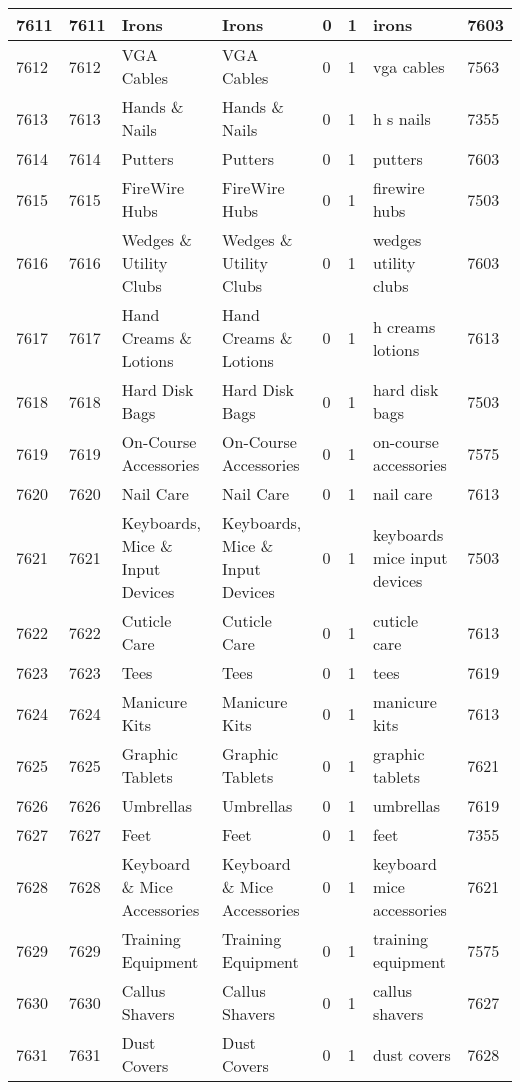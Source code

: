 \begin{longtable}{|l|l|l|l|l|l|l|l|}
7611 & 7611 & Irons & Irons & 0 & 1 & irons & 7603 \\ \hline 
7612 & 7612 & VGA Cables & VGA Cables & 0 & 1 & vga cables & 7563 \\ \hline 
7613 & 7613 & Hands \& Nails & Hands \& Nails & 0 & 1 & h s nails & 7355 \\ \hline 
7614 & 7614 & Putters & Putters & 0 & 1 & putters & 7603 \\ \hline 
7615 & 7615 & FireWire Hubs & FireWire Hubs & 0 & 1 & firewire hubs & 7503 \\ \hline 
7616 & 7616 & Wedges \& Utility Clubs & Wedges \& Utility Clubs & 0 & 1 & wedges utility clubs & 7603 \\ \hline 
7617 & 7617 & Hand Creams \& Lotions & Hand Creams \& Lotions & 0 & 1 & h creams lotions & 7613 \\ \hline 
7618 & 7618 & Hard Disk Bags & Hard Disk Bags & 0 & 1 & hard disk bags & 7503 \\ \hline 
7619 & 7619 & On-Course Accessories & On-Course Accessories & 0 & 1 & on-course accessories & 7575 \\ \hline 
7620 & 7620 & Nail Care & Nail Care & 0 & 1 & nail care & 7613 \\ \hline 
7621 & 7621 & Keyboards, Mice \& Input Devices & Keyboards, Mice \& Input Devices & 0 & 1 & keyboards mice input devices & 7503 \\ \hline 
7622 & 7622 & Cuticle Care & Cuticle Care & 0 & 1 & cuticle care & 7613 \\ \hline 
7623 & 7623 & Tees & Tees & 0 & 1 & tees & 7619 \\ \hline 
7624 & 7624 & Manicure Kits & Manicure Kits & 0 & 1 & manicure kits & 7613 \\ \hline 
7625 & 7625 & Graphic Tablets & Graphic Tablets & 0 & 1 & graphic tablets & 7621 \\ \hline 
7626 & 7626 & Umbrellas & Umbrellas & 0 & 1 & umbrellas & 7619 \\ \hline 
7627 & 7627 & Feet & Feet & 0 & 1 & feet & 7355 \\ \hline 
7628 & 7628 & Keyboard \& Mice Accessories & Keyboard \& Mice Accessories & 0 & 1 & keyboard mice accessories & 7621 \\ \hline 
7629 & 7629 & Training Equipment & Training Equipment & 0 & 1 & training equipment & 7575 \\ \hline 
7630 & 7630 & Callus Shavers & Callus Shavers & 0 & 1 & callus shavers & 7627 \\ \hline 
7631 & 7631 & Dust Covers & Dust Covers & 0 & 1 & dust covers & 7628 \\ \hline 

\end{longtable}
